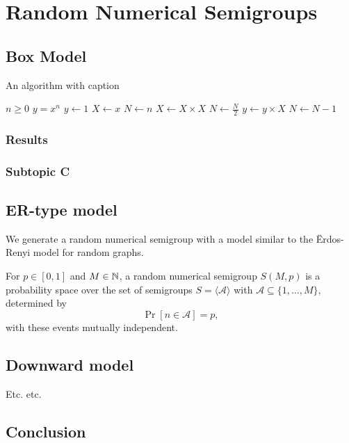
\chapter{Random Numerical Semigroups}\label{chap:contrib1}

\section{Box Model}\label{sec:randomsmpgs:intro}

\begin{algorithm}
\caption{An algorithm with caption}\label{alg:cap}
\begin{algorithmic}
\Require $n \geq 0$
\Ensure $y = x^n$
\State $y \gets 1$
\State $X \gets x$
\State $N \gets n$
    \State $X \gets X \times X$
    \State $N \gets \frac{N}{2}$  
    \State $y \gets y \times X$
    \State $N \gets N - 1$
\EndIf
\EndWhile
\end{algorithmic}
\end{algorithm}

\subsection{Results}\label{sec:contrib1:theme1:B}

\subsection{Subtopic C}\label{sec:contrib1:theme1:C}

\section{ER-type model}

We generate a random numerical semigroup with a model similar to the Ërdos-Renyi model for random graphs. 

\begin{definition}
    For $p \in [0, 1]$ and $M \in \mathbb{N}$, a random numerical semigroup $S(M, p)$ is a probability space over the set of semigroups $S = \langle\mathcal{A}\rangle$ with $\mathcal{A} \subseteq \{1,...,M\}$, determined by
    \[\Pr[n \in \mathcal{A}] = p,\]
    with these events mutually independent.
\end{definition}

\section{Downward model}\label{sec:contrib1:theme2}

Etc. etc.



\section{Conclusion}
